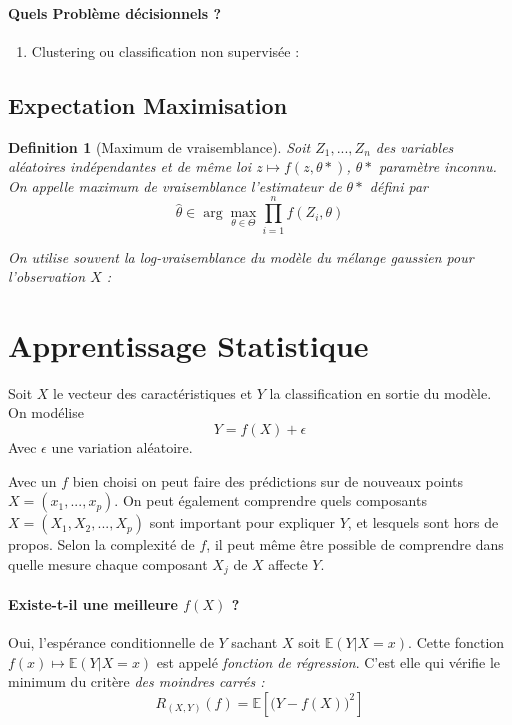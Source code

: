 \documentclass{article}
\newtheorem{defi}{Definition}
\begin{document}
\paragraph{Quels Problème décisionnels ?}

\begin{enumerate}
\item Clustering ou classification non supervisée : 
\end{enumerate}


\subsection{Expectation Maximisation}

\begin{defi}[Maximum de vraisemblance]
Soit $Z_1,...,Z_n$ des variables aléatoires indépendantes et de même loi $z \mapsto f(z,\theta*)$,  $\theta*$ paramètre inconnu. On appelle maximum de vraisemblance l'estimateur de $\theta*$ défini par 
\[\hat{\theta} \in \arg \max_{\theta\in\Theta} \prod_{i=1}^n f(Z_i, \theta)\]

On utilise souvent la log-vraisemblance du modèle du mélange gaussien pour l'observation $X$ :

\end{defi}



\section{Apprentissage Statistique}
Soit $X$ le vecteur des caractéristiques et $Y$ la classification en sortie du modèle. On modélise
\[Y = f(X) + \epsilon\]
Avec $\epsilon$ une variation aléatoire.
\bigskip

Avec un $f$ bien choisi on peut faire des prédictions sur de nouveaux points $X=(x_1,...,x_p)$. On peut également comprendre quels composants $X=(X_1,X_2,...,X_p)$ sont important pour expliquer $Y$, et lesquels sont hors de propos. Selon la complexité de $f$, il peut même être possible de comprendre dans quelle mesure chaque composant $X_j$ de $X$ affecte $Y$.

\paragraph{Existe-t-il une meilleure $f(X)$ ?}
Oui, l'espérance conditionnelle de $Y$ sachant $X$ soit $\mathbb{E}(Y|X=x)$. Cette fonction $f(x) \mapsto \mathbb{E}(Y|X=x)$ est appelé \emph{fonction de régression}. C'est elle qui vérifie le minimum du critère \emph{des moindres carrés :}
\[R_{(X,Y)}(f) = \mathbb{E}[\big(Y-f(X)\big)^2]\]
\end{document}
